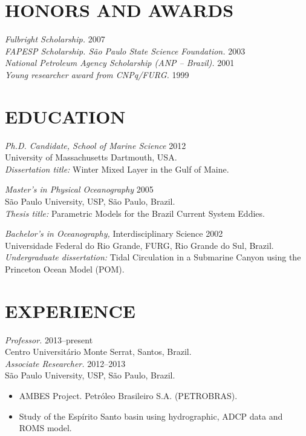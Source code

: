 \documentclass[line,margin]{res}
\begin{document}
\address{R. Abadia dos Dourados 66, São Paulo--SP 05586-030}
\address{Cell: +55 11 9 58305554, e-mail: ocefpaf@gmail.com}


\begin{resume}

\section{HONORS AND AWARDS}
{\sl Fulbright Scholarship.} \hfill 2007 \\
{\sl FAPESP Scholarship. São Paulo State Science Foundation.} \hfill 2003 \\
{\sl National Petroleum Agency Scholarship (ANP -- Brazil).} \hfill 2001  \\
{\sl Young researcher award from CNPq/FURG.} \hfill 1999

\section{EDUCATION}
{\sl Ph.D. Candidate, School of Marine Science} \hfill 2012 \\
University of Massachusetts Dartmouth, USA.\\
{\sl Dissertation title:} Winter Mixed Layer in the Gulf of Maine.

{\sl Master's in Physical Oceanography} \hfill 2005 \\
São Paulo University, USP, São Paulo, Brazil. \\
{\sl Thesis title:} Parametric Models for the Brazil Current System Eddies.

{\sl Bachelor's in Oceanography,} Interdisciplinary Science \hfill 2002 \\
Universidade Federal do Rio Grande, FURG, Rio Grande do Sul, Brazil.\\
{\sl Undergraduate dissertation:} Tidal Circulation in a Submarine Canyon using
the Princeton Ocean Model (POM).

\section{EXPERIENCE}
{\sl Professor.} \hfill 2013--present \\
Centro Universitário Monte Serrat, Santos, Brazil. \\

{\sl Associate Researcher.} \hfill 2012--2013 \\
São Paulo University, USP, São Paulo, Brazil. \\
\begin{itemize}  \itemsep -2pt
  \item AMBES Project. Petróleo Brasileiro S.A. (PETROBRAS).
  \item Study of the Espírito Santo basin using hydrographic, ADCP data and
        ROMS model.
\end{itemize}


\end{resume}
\end{document}
